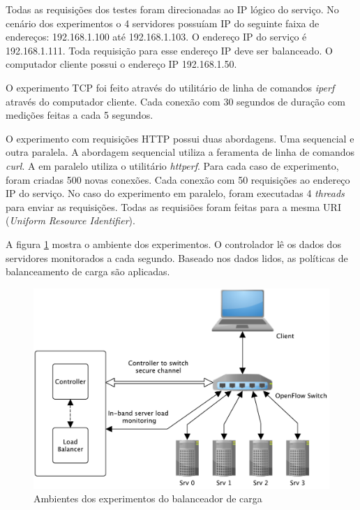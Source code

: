 Todas as requisições dos testes foram direcionadas ao IP lógico do 
serviço.
No cenário dos experimentos o 4 servidores possuíam IP do seguinte faixa de 
endereços: 192.168.1.100 até 192.168.1.103.
O endereço IP do serviço é 192.168.1.111.
Toda requisição para esse endereço IP deve ser balanceado.
O computador cliente possui o endereço IP 192.168.1.50.

O experimento TCP foi feito através do utilitário de linha de comandos 
\emph{iperf} através do computador cliente.
Cada conexão com 30 segundos de duração com medições feitas a cada 5 segundos.

O experimento com requisições HTTP possui duas abordagens.
Uma sequencial e outra paralela.
A abordagem sequencial utiliza a feramenta de linha de comandos \emph{curl}.
A em paralelo utiliza o utilitário \emph{httperf}.
Para cada caso de experimento, foram criadas 500 novas conexões.
Cada conexão com 50 requisições ao endereço IP do serviço.
No caso do experimento em paralelo, foram executadas 4 \emph{threads} para 
enviar as requisições.
Todas as requisiões foram feitas para a mesma URI (\emph{Uniform Resource
Identifier}).

A figura \ref{fig:testbed} mostra o ambiente dos experimentos.
O controlador lê os dados dos servidores monitorados a cada segundo.
Baseado nos dados lidos, as políticas de balanceamento de carga são aplicadas.

\begin{figure}[htb!]
    \centering
    \includegraphics[width=\linewidth]{img/balancer-testbed-img}
    \caption{Ambientes dos experimentos do balanceador de carga}
    \label{fig:testbed}
\end{figure}

